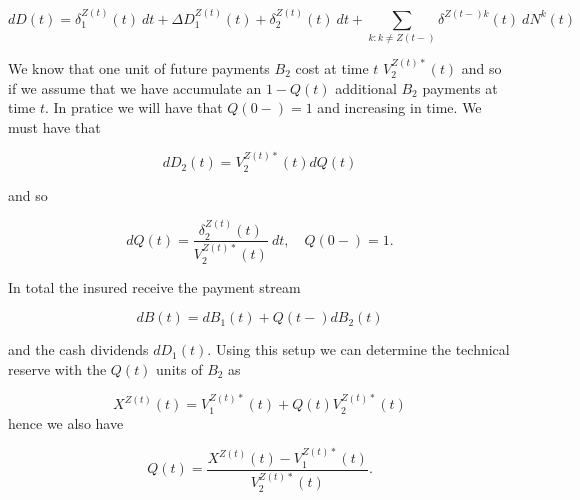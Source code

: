 \documentclass[a4paper,12pt,openany]{book}
\begin{document}
\[
dD(t)=\delta_1^{Z(t)}(t)\ dt+\Delta D_1^{Z(t)}(t)+ \delta_2^{Z(t)}(t)\ dt+\sum_{k:k\ne Z(t-)}\delta^{Z(t-)k}(t)\ dN^k(t) 
\]

We know that one unit of future payments \(B_2\) cost at time \(t\) \(V_2^{Z(t)*}(t)\) and so if we assume that we have accumulate an \(1-Q(t)\) additional \(B_2\) payments at time \(t\). In pratice we will have that \(Q(0-)=1\) and increasing in time. We must have that

\[
dD_2(t)=V^{Z(t)*}_2(t)dQ(t)
\]

and so

\[
dQ(t)=\frac{\delta_2^{Z(t)}(t)}{V_2^{Z(t)*}(t)}\ dt,\quad Q(0-)=1.
\]

In total the insured receive the payment stream

\[
dB(t)=dB_1(t)+Q(t-)dB_2(t)
\]

and the cash dividends \(dD_1(t)\). Using this setup we can determine the technical reserve with the \(Q(t)\) units of \(B_2\) as

\[
X^{Z(t)}(t)=V_1^{Z(t)*}(t)+Q(t)V_2^{Z(t)*}(t)
\]
hence we also have

\[
Q(t)=\frac{X^{Z(t)}(t)-V_1^{Z(t)*}(t)}{V_2^{Z(t)*}(t)}.
\]
\end{document}
